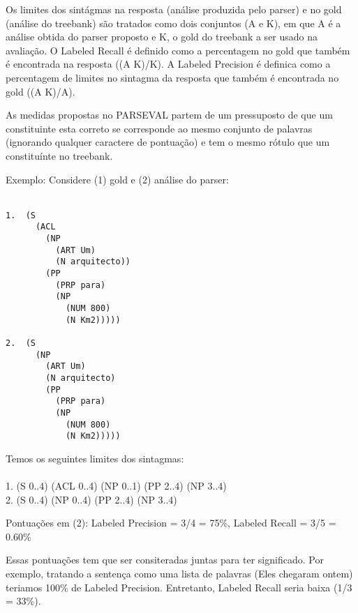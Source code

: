 Os limites dos sintágmas na resposta (análise produzida pelo parser) e no gold (análise do treebank) são tratados como dois conjuntos (A e K), em que A é a análise obtida do parser proposto e K, o gold do treebank a ser usado na avaliação. O Labeled Recall é definido como a percentagem no gold que também é encontrada na resposta ((A K)/K). A Labeled Precision é definica como a percentagem de limites no sintagma da resposta que também é encontrada no gold ((A K)/A).

As medidas propostas no PARSEVAL partem de um pressuposto de que um constituinte esta correto se corresponde ao mesmo conjunto de palavras (ignorando qualquer caractere de pontuação) e tem o mesmo rótulo que um constituínte no treebank.


Exemplo: Considere (1) gold e (2) análise do parser:\\ \\

\begin{verbatim}
1.  (S
      (ACL
        (NP
          (ART Um)
          (N arquitecto))
        (PP
          (PRP para)
          (NP
            (NUM 800)
            (N Km2)))))

2.  (S
      (NP
        (ART Um)
        (N arquitecto)
        (PP
          (PRP para)
          (NP
            (NUM 800)
            (N Km2)))))
\end{verbatim}

Temos os seguintes limites dos sintagmas:\\ \\
1. (S 0..4) (ACL 0..4) (NP 0..1) (PP 2..4) (NP 3..4)\\
2. (S 0..4) (NP 0..4) (PP 2..4) (NP 3..4)

Pontuações em (2): Labeled Precision = 3/4 = 75{\%}, Labeled Recall = 3/5 = 0.60{\%}

Essas pontuações tem que ser consiteradas juntas para ter significado. Por exemplo, tratando a sentença como uma lista de palavras (Eles chegaram ontem) teriamos 100{\%} de Labeled Precision. Entretanto, Labeled Recall seria baixa (1/3 = 33{\%}).